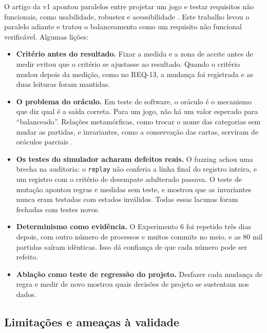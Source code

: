 O artigo da v1 apontou paralelos entre projetar um jogo e testar requisitos não funcionais, como usabilidade,
robustez e acessibilidade \cite{oliveira2025critical}. Este trabalho levou o paralelo adiante e tratou o
balanceamento como um requisito não funcional verificável. Algumas lições:
\begin{itemize}
  \item \textbf{Critério antes do resultado.} Fixar a medida e a zona de aceite antes de medir evitou que o
    critério se ajustasse ao resultado. Quando o critério mudou depois da medição, como no REQ-13, a mudança
    foi registrada e as duas leituras foram mantidas.
  \item \textbf{O problema do oráculo.} Em teste de software, o oráculo é o mecanismo que diz qual é a saída
    correta. Para um jogo, não há um valor esperado para ``balanceado''. Relações metamórficas, como trocar o nome
    das categorias sem mudar as partidas, e invariantes, como a conservação das cartas, serviram de oráculos
    parciais \cite{chen1998,segura2016}.
  \item \textbf{Os testes do simulador acharam defeitos reais.} O fuzzing achou uma brecha na auditoria: o
    \texttt{replay} não conferia a linha final do registro inteira, e um registro com o critério de desempate
    adulterado passava. O teste de mutação apontou regras e medidas sem teste, e mostrou que as invariantes nunca
    eram testadas com estados inválidos. Todas essas lacunas foram fechadas com testes novos.
  \item \textbf{Determinismo como evidência.} O Experimento 6 foi repetido três dias depois, com outro número
    de processos e muitos commits no meio, e as 80 mil partidas saíram idênticas. Isso dá confiança de que cada
    número pode ser refeito.
  \item \textbf{Ablação como teste de regressão do projeto.} Desfazer cada mudança de regra e medir de novo
    mostrou quais decisões de projeto se sustentam nos dados.
\end{itemize}

\subsection{Limitações e ameaças à validade}
\label{sec:ameacas}

 \cite{wohlin2012}


